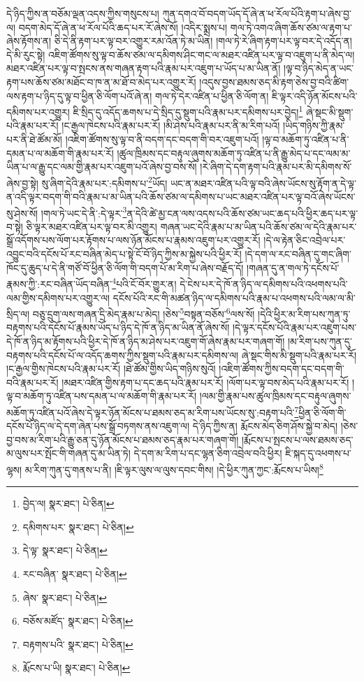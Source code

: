 དེ་ཉིད་ཀྱིས་ན་བཅོམ་ལྡན་འདས་ཀྱིས་གསུངས་པ། ཀུན་དགའ་བོ་བདག་ཡོད་དོ་ཞེ་ན་ཕ་རོལ་པོའི་རྟག་པ་ཞེས་བྱ་ལ། བདག་མེད་དོ་ཞེ་ན་ཕ་རོལ་པོའི་ཆད་པར་རོ་ཞེས་སོ། །འདིར་སྨྲས་པ། གལ་ཏེ་འགའ་ཞིག་ཆོས་ཙམ་ལ་རྟག་པ་ཞེས་རྟོགས་ན། ཅི་དེ་ནི་རྟག་པར་ལྟ་བར་འགྱུར་རམ་འོན་ཏེ་མ་ཡིན། །གལ་ཏེ་རེ་ཞིག་རྟག་པར་ལྟ་བར་དེ་འདོད་ན། དེ་མི་རུང་སྟེ། འཇིག་ཚོགས་སུ་ལྟ་བ་ཆོས་ཙམ་ལ་དམིགས་ཤིང་གང་ལ་མཐར་འཛིན་པར་ལྟ་བ་འཇུག་པ་ནི་མེད་ལ། མཐར་འཛིན་པར་ལྟ་བ་སྤངས་ནས་གཞན་རྟག་པའི་རྣམ་པར་འཇུག་པ་ཡོད་པ་མ་ཡིན་ནོ། །ལྟ་བ་ཉིད་མེད་ན་ཡང་རྟག་པས་ཆོས་ཙམ་མཐོང་བ་ཁ་ན་མ་ཐོ་བ་མེད་པར་འགྱུར་རོ། །འདུས་བྱས་ཐམས་ཅད་མི་རྟག་ཅེས་བྱ་བའི་ཚིག་ལས་རྟག་པ་ཉིད་དུ་ལྟ་བ་ཕྱིན་ཅི་ལོག་པའོ་ཞེ་ན། གལ་ཏེ་དེར་འཛིན་པ་ཕྱིན་ཅི་ལོག་ན། ཇི་ལྟར་འདི་ཉོན་མོངས་པའི་དམིགས་པར་འགྱུར། ཇི་སྲིད་དུ་འདོད་ཆགས་པ་དེ་སྲིད་དུ་སྡུག་པའི་རྣམ་པར་དམིགས་པར་བྱེད།\footnote{བྱེད་ལ།  སྣར་ཐང་།  པེ་ཅིན། } ཞེ་སྡང་མི་སྡུག་པའི་རྣམ་པར་རོ། །ང་རྒྱལ་ཁེངས་པའི་རྣམ་པར་རོ། །མི་ཤེས་པའི་རྣམ་པར་ནི་མ་རིག་པའོ། །ཡིད་གཉིས་ཀྱི་རྣམ་པར་ནི་ཐེ་ཚོམ་མོ། །འཇིག་ཚོགས་སུ་ལྟ་བ་ནི་བདག་དང་བདག་གི་བར་འཇུག་པའོ། །ལྟ་བ་མཆོག་ཏུ་འཛིན་པ་ནི་དམན་པ་ལ་མཆོག་གི་རྣམ་པར་རོ། །ཚུལ་ཁྲིམས་དང་བརྟུལ་ཞུགས་མཆོག་ཏུ་འཛིན་པ་ནི་རྒྱུ་མེད་པ་དང་ལམ་མ་ཡིན་པ་ལ་རྒྱུ་དང་ལམ་གྱི་རྣམ་པར་འཇུག་པའོ་ཞེས་བྱ་བས་སོ། །རེ་ཞིག་དེ་དག་རྟག་པའི་རྣམ་པར་མི་དམིགས་སོ་ཞེས་བྱ་སྟེ། སུ་ཞིག་དེའི་རྣམ་པར་:དམིགས་པ་\footnote{དམིགས་པར་  སྣར་ཐང་།  པེ་ཅིན། }ཡོད། ཡང་ན་མཐར་འཛིན་པའི་ལྟ་བའི་ཞེས་ཡོངས་སུ་རྟོག་ན་དེ་ལྟ་ན་འདི་ལྟར་བདག་གི་བའི་རྣམ་པ་མ་ཡིན་པའི་ཆོས་ཙམ་ལ་དམིགས་པ་ཡང་མཐར་འཛིན་པར་ལྟ་བའོ་ཞེས་ཡོངས་སུ་ཤེས་སོ། །གལ་ཏེ་ཡང་དེ་ནི་:དེ་ལྟར་\footnote{དེ་ལྟ་  སྣར་ཐང་།  པེ་ཅིན། }ན་དེའི་ཚེ་མྱ་ངན་ལས་འདས་པའི་ཆོས་ཙམ་ཡང་ཆད་པའི་ཕྱིར་ཆད་པར་ལྟ་བ་སྟེ། ཅི་ལྟར་མཐར་འཛིན་པར་ལྟ་བར་མི་འགྱུར། གཞན་ཡང་དེའི་རྣམ་པ་མ་ཡིན་པའི་ཆོས་ཙམ་ལ་དེའི་རྣམ་པར་སྒྲོ་འདོགས་པས་ལོག་པར་རྟོགས་པ་ལས་ཉོན་མོངས་པ་རྣམས་འཇུག་པར་འགྱུར་རོ། །དེ་ལ་རྟེན་ཅིང་འབྲེལ་པར་འབྱུང་བའི་དངོས་པོ་རང་བཞིན་མེད་པ་སྟེ་ངོ་བོ་ཉིད་ཀྱིས་མ་སྐྱེས་པའི་ཕྱིར་རོ། །དེ་དག་ལ་རང་བཞིན་དུ་གང་ཞིག་ཁོང་དུ་ཆུད་པ་དེ་ནི་གཙོ་བོ་ཕྱིན་ཅི་ལོག་གི་བདག་པོ་མ་རིག་པ་ཞེས་བརྗོད་དོ། །གཞན་དུ་ན་གལ་ཏེ་དངོས་པོ་རྣམས་ཀྱི་:རང་བཞིན་ཡོད་བཞིན་\footnote{རང་བཞིན་  སྣར་ཐང་།  པེ་ཅིན། }པའི་ངོ་བོར་གྱུར་ན། དེ་ངེས་པར་དེ་ཁོ་ན་ཉིད་ལ་དམིགས་པའི་འཕགས་པའི་ལམ་གྱིས་དམིགས་པར་འགྱུར་ལ། དངོས་པོའི་རང་གི་མཚན་ཉིད་ལ་དམིགས་པའི་རྣམ་པ་འཕགས་པའི་ལམ་ལ་མི་སྲིད་ལ། བཅུ་དྲུག་ལས་གཞན་དྲི་མེད་རྣམ་པ་མེད། །ཅེས་\footnote{ཞེས་  སྣར་ཐང་།  པེ་ཅིན། }བསྟན་བཅོས་\footnote{བཅོས་མཛོད་  སྣར་ཐང་།  པེ་ཅིན། }ལས་སོ། །དེའི་ཕྱིར་མ་རིག་པས་ཀུན་ཏུ་བརྟགས་པའི་དངོས་པོ་རྣམས་ཡོད་པ་ཉིད་དེ་ཁོ་ན་ཉིད་མ་ཡིན་ནོ་ཞེས་སོ། །དེ་ལྟར་དངོས་པོའི་རྣམ་པར་འཇུག་པས་དེ་ཁོ་ན་ཉིད་མ་རྟོགས་པའི་ཕྱིར་དེ་ཁོ་ན་ཉིད་མ་ཤེས་པར་འཇུག་གོ་ཞེས་རྣམ་པར་གཞག་གོ། །མ་རིག་པས་ཀུན་དུ་བརྟགས་པའི་དངོས་པོ་ལ་འདོད་ཆགས་ཀྱིས་སྡུག་པའི་རྣམ་པར་དམིགས་ལ། ཞེ་སྡང་གིས་མི་སྡུག་པའི་རྣམ་པར་རོ། །ང་རྒྱལ་གྱིས་ཁེངས་པའི་རྣམ་པར་རོ། །ཐེ་ཚོམ་གྱིས་ཡིད་གཉིས་སུའོ། །འཇིག་ཚོགས་ཀྱིས་བདག་དང་བདག་གི་བའི་རྣམ་པར་རོ། །མཐར་འཛིན་གྱིས་རྟག་པ་དང་ཆད་པའི་རྣམ་པར་རོ། །ལོག་པར་ལྟ་བས་མེད་པའི་རྣམ་པར་རོ། །ལྟ་བ་མཆོག་ཏུ་འཛིན་པས་དམན་པ་ལ་མཆོག་གི་རྣམ་པར་རོ། །ལམ་གྱི་རྣམ་པས་ཚུལ་ཁྲིམས་དང་བརྟུལ་ཞུགས་མཆོག་ཏུ་འཛིན་པའོ་ཞེས་དེ་ལྟར་ཉོན་མོངས་པ་ཐམས་ཅད་མ་རིག་པས་ཡོངས་སུ་:བརྟག་པའི་\footnote{བརྟགས་པའི་  སྣར་ཐང་།  པེ་ཅིན། }ཕྱིན་ཅི་ལོག་གི་དངོས་པོ་ཉིད་ལ་དེ་དག་ཞེན་པས་སྒྲོ་བཏགས་ནས་འཇུག་ལ། དེ་ཉིད་ཀྱིས་ན། རྨོངས་མེད་ཅིག་ཤོས་སྐྱེ་བ་མེད། །ཅེས་བྱ་བས་མ་རིག་པའི་རྒྱུ་ཅན་དུ་ཉོན་མོངས་པ་ཐམས་ཅད་རྣམ་པར་གཞག་གོ། །རྨོངས་པ་སྤངས་པ་ལས་ཐམས་ཅད་མ་ལུས་པར་སྤོང་གི་གཞན་དུ་མ་ཡིན་ཏེ། དེ་དག་མ་རིག་པ་དང་ལྷན་ཅིག་འབྲེལ་བའི་ཕྱིར། ཇི་སྐད་དུ་འཕགས་པ་ལྷས། མ་རིག་ཀུན་དུ་གནས་པ་ནི། །ཇི་ལྟར་ལུས་ལ་ལུས་དབང་གིས། །དེ་ཕྱིར་ཀུན་ཀྱང་:རྨོངས་པ་ཡིས།\footnote{རྨོངས་པ་ཡི།  སྣར་ཐང་།  པེ་ཅིན། } 
